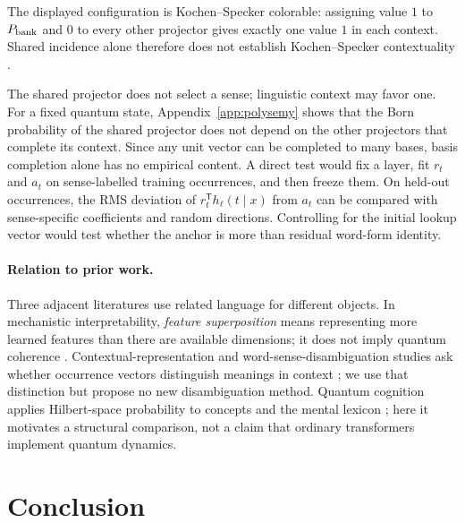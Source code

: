 \documentclass[
  aps,
  reprint,
  superscriptaddress,
  floatfix,
  nofootinbib,
  longbibliography
]{revtex4-2}
\newcommand{\T}{^{\mathsf T}}
\begin{document}
The displayed configuration is Kochen--Specker colorable: assigning value
$1$ to $P_{\rm bank}$ and $0$ to every other projector gives exactly one value
$1$ in each context.  Shared incidence alone therefore does not establish
Kochen--Specker contextuality \cite{specker-60,kochen1}.

The shared projector does not select a sense; linguistic context may favor
one.  For a fixed quantum state, Appendix~\ref{app:polysemy} shows that the
Born probability of the shared projector does not depend on the other
projectors that complete its context.  Since any unit vector can be completed
to many bases, basis completion alone has no empirical content.  A direct test
would fix a layer, fit $r_t$ and $a_t$ on sense-labelled training occurrences,
and then freeze them.  On held-out occurrences, the RMS deviation of
$r_t\T h_\ell(t\mid x)$ from $a_t$ can be compared with sense-specific
coefficients and random directions.  Controlling for the initial lookup vector
would test whether the anchor is more than residual word-form identity.



\paragraph*{Relation to prior work.}
Three adjacent literatures use related language for different objects.  In
mechanistic interpretability, \emph{feature superposition} means representing
more learned features than there are available dimensions; it does not imply
quantum coherence \cite{elhage2022superposition}.  Contextual-representation
and word-sense-disambiguation studies ask whether occurrence vectors
distinguish meanings in context
\cite{ethayarajh2019,pilehvar2019wic,wiedemann2019does,scarlini2020ares}; we
use that distinction but propose no new disambiguation method.  Quantum
cognition applies Hilbert-space probability to concepts and the mental lexicon
\cite{bruza2009lexicon,Busemeyer2012}; here it motivates a structural
comparison, not a claim that ordinary transformers implement quantum dynamics.



\section{Conclusion}
\label{sec:conclusion}
\end{document}
